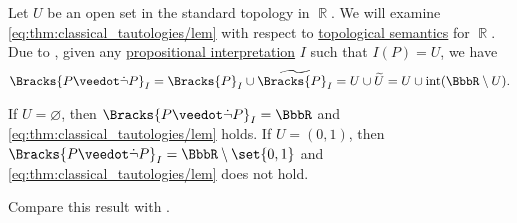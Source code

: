 \begin{example}\label{ex:topological_semantics_lem_counterexample}
  Let \( U \) be an open set in the standard topology in \( \BbbR \). We will examine \eqref{eq:thm:classical_tautologies/lem} with respect to \hyperref[def:propositional_topological_semantics]{topological semantics} for \( \BbbR \). Due to , given any \hyperref[def:propositional_valuation]{propositional interpretation} \( I \) such that \( I(P) = U \), we have
  \begin{equation*}
    \Bracks{P \synvee \synneg P}_I
    =
    \Bracks{P}_I \cup \widetilde{\Bracks{P}_I}
    =
    U \cup \widetilde{U}
    =
    U \cup \Int(\BbbR \setminus U).
  \end{equation*}

  If \( U = \varnothing \), then \( \Bracks{P \synvee \synneg P}_I = \BbbR \) and \eqref{eq:thm:classical_tautologies/lem} holds. If \( U = (0, 1) \), then \( \Bracks{P \synvee \synneg P}_I = \BbbR \setminus \set{ 0, 1 } \) and \eqref{eq:thm:classical_tautologies/lem} does not hold.

  Compare this result with .
\end{example}

